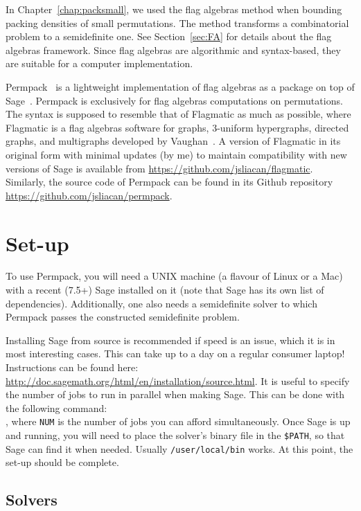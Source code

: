 In Chapter~\ref{chap:packsmall}, we used the flag algebras method when bounding packing densities of small permutations. The method transforms a combinatorial problem to a semidefinite one. See Section~\ref{sec:FA} for details about the flag algebras framework. Since flag algebras are algorithmic and syntax-based, they are suitable for a computer implementation.

Permpack~\cite{permpack} is a lightweight implementation of flag algebras as a package on top of Sage~\cite{sagemath}. Permpack is exclusively for flag algebras computations on permutations. The syntax is supposed to resemble that of Flagmatic as much as possible, where Flagmatic is a flag algebras software for graphs, 3-uniform hypergraphs, directed graphs, and multigraphs developed by Vaughan~\cite{flagmatic}. A version of Flagmatic in its original form with minimal updates (by me) to maintain compatibility with new versions of Sage is available from \url{https://github.com/jsliacan/flagmatic}. Similarly, the source code of Permpack can be found in its Github repository \url{https://github.com/jsliacan/permpack}. 

\section{Set-up}
\label{sec:permpack-setup}

To use Permpack, you will need a UNIX machine (a flavour of Linux or a Mac) with a recent (7.5+) Sage installed on it (note that Sage has its own list of dependencies). Additionally, one also needs a semidefinite solver to which Permpack passes the constructed semidefinite problem.

Installing Sage from source is recommended if speed is an issue, which it is in most interesting cases. This can take up to a day on a regular consumer laptop! Instructions can be found here: \url{http://doc.sagemath.org/html/en/installation/source.html}. It is useful to specify the number of jobs to run in parallel when making Sage. This can be done with the following command:\\ , where \texttt{NUM} is the number of jobs you can afford simultaneously. Once Sage is up and running, you will need to place the solver's binary file in the \texttt{\$PATH}, so that Sage can find it when needed. Usually \texttt{/user/local/bin} works. At this point, the set-up should be complete.


\subsection{Solvers}
\label{sec:permpack-solvers}

